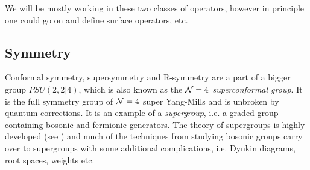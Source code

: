We will be mostly working in these two classes of operators, however in principle one could go on and define surface operators, etc.

\subsection{Symmetry}

Conformal symmetry, supersymmetry and R-symmetry are a part of a bigger group $PSU(2,2|4)$, which is also known as the \emph{$\mathcal{N}=4$ superconformal group}. 
It is the full symmetry group of $\mathcal{N}=4$ super Yang-Mills and is unbroken by quantum corrections. 
It is an example of a \emph{supergroup}, i.e. a graded group containing bosonic and fermionic generators. 
The theory of supergroups is highly developed (see \cite{Beisert:2010kp}) and much of the techniques from studying bosonic groups carry over to supergroups with some additional complications, i.e. Dynkin diagrams, root spaces, weights etc. 


